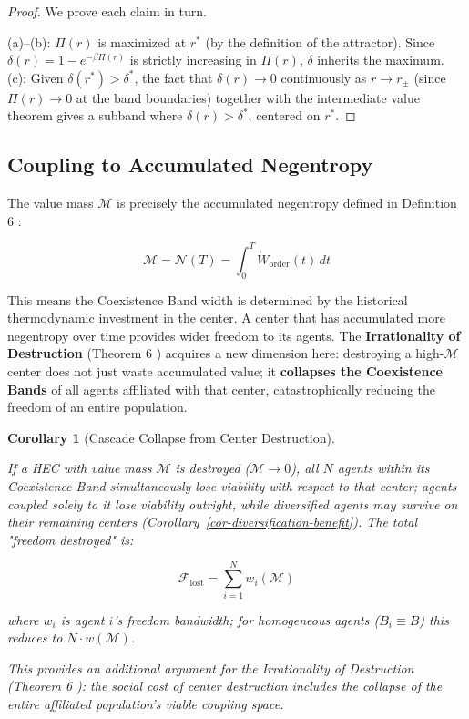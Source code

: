 \documentclass[11pt]{article}
\theoremstyle{plain}
\newtheorem{corollary}[theorem]{Corollary}
\theoremstyle{definition}
\theoremstyle{remark}
\let\origsubsection\subsection
\renewcommand{\subsection}{\needspace{7\baselineskip}\origsubsection}
\begin{document}
\begin{proof}
We prove each claim in turn.

(a)–(b): $\Pi(r)$ is maximized at $r^*$ (by the definition of the attractor). Since $\delta(r) = 1 - e^{-\beta \Pi(r)}$ is strictly increasing in $\Pi(r)$, $\delta$ inherits the maximum. (c): Given $\delta(r^*) > \delta^*$, the fact that $\delta(r) \to 0$ continuously as $r \to r_\pm$ (since $\Pi(r) \to 0$ at the band boundaries) together with the intermediate value theorem gives a subband where $\delta(r) > \delta^*$, centered on $r^*$.
\end{proof}

\subsection{Coupling to Accumulated
Negentropy}\label{coupling-to-accumulated-negentropy}

The value mass \(\mathcal{M}\) is precisely the accumulated negentropy
defined in Definition 6 \citep{TC-III}:

\[\mathcal{M} = \mathcal{N}(T) = \int_0^T \dot{W}_{\text{order}}(t) \, dt\]

This means the Coexistence Band width is determined by the historical
thermodynamic investment in the center. A center that has accumulated
more negentropy over time provides wider freedom to its agents. The
\textbf{Irrationality of Destruction} (Theorem 6 \citep{TC-III})
acquires a new dimension here: destroying a high-\(\mathcal{M}\) center
does not just waste accumulated value; it \textbf{collapses the
Coexistence Bands} of all agents affiliated with that center,
catastrophically reducing the freedom of an entire population.

\begin{corollary}[Cascade Collapse from Center Destruction]
\label{cor-cascade-collapse}

If a HEC with value mass $\mathcal{M}$ is destroyed ($\mathcal{M} \to 0$), all $N$ agents within its Coexistence Band simultaneously lose viability with respect to that center; agents coupled solely to it lose viability outright, while diversified agents may survive on their remaining centers (Corollary~\ref{cor-diversification-benefit}). The total "freedom destroyed" is:

$$\mathcal{F}_{\text{lost}} = \sum_{i=1}^{N} w_i(\mathcal{M})$$

where $w_i$ is agent $i$'s freedom bandwidth; for homogeneous agents ($B_i \equiv B$) this reduces to $N \cdot w(\mathcal{M})$.

This provides an additional argument for the Irrationality of Destruction (Theorem 6 \citep{TC-III}): the social cost of center destruction includes the collapse of the entire affiliated population's viable coupling space.
\end{corollary}
\end{document}
